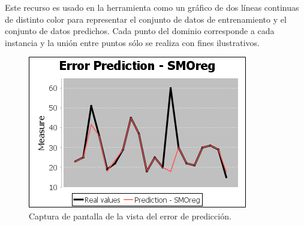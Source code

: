 Este recurso es usado en la herramienta como un gráfico de dos líneas
continuas de distinto color para representar el conjunto de datos
de entrenamiento y el conjunto de datos predichos. Cada punto del
dominio corresponde a cada instancia y la unión entre puntos sólo
se realiza con fines ilustrativos. 

\begin{figure}
\begin{centering}
\includegraphics[scale=0.8]{images/screenshot-error-curve}
\par\end{centering}

\caption{Captura de pantalla de la vista del error de predicción. \label{fig:screenshot-error-curve}}
\end{figure}

